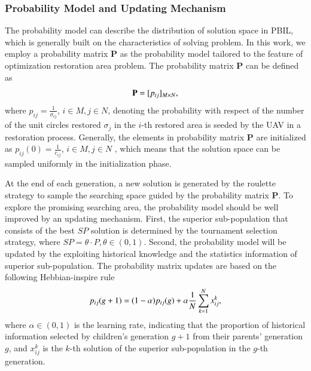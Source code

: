 \documentclass[preprint,5pt]{elsarticle}
\begin{document}
\subsubsection{Probability Model and Updating Mechanism}
The probability model can describe the distribution of solution space in PBIL, which is generally built on the characteristics of solving problem. In this work, we employ a probability matrix $\mathbf{P}$ as the probability model tailored to the feature of optimization restoration area problem. The probability matrix $\mathbf{P}$ can be defined as
\begin{equation} \label{Probability-Model}
\begin{small}
\mathbf{P} = [p_{ij}]_{M \times N},
\end{small}
\end{equation}
where $p_{ij} = \frac{1}{\sigma_{ij}}$, $i\in M, j \in N$, denoting the probability with respect of the number of the unit circles restored $\sigma_j$ in the $i$-th restored area is seeded by the UAV in a restoration process. Generally,
the elements in probability matrix $\mathbf{P}$ are initialized as $p_{ij}(0) = \frac{1}{c_{ij}}$, $i\in M, j \in N$ , which means that the solution space can be sampled uniformly in the initialization phase.

At the end of each generation, a new solution is generated by the roulette strategy to sample the searching space guided by the probability matrix $\mathbf{P}$. To explore the promising searching area, the probability model should be well improved by an updating mechanism. First, the superior sub-population that consists of the best $SP$ solution is determined by the tournament selection strategy, where $SP = \theta \cdot P, \theta \in (0,1)$. Second, the probability model will be updated by the exploiting historical knowledge and the statistics information of superior sub-population. The probability matrix updates are based on the following Hebbian-inspire rule
\begin{equation} \label{Updating-Mechanism}
\begin{small}
p_{ij}(g+1) = (1-\alpha)p_{ij}(g) + \alpha\frac{1}{N}\sum^N_{k=1}x^k_{ij},
\end{small}
\end{equation}
where $\alpha \in (0,1)$ is the learning rate, indicating that the proportion of historical information selected by children's generation $g+1$ from their parents' generation $g$, and $x^k_{ij}$ is the $k$-th solution of the superior sub-population in  the $g$-th generation.
\end{document}
